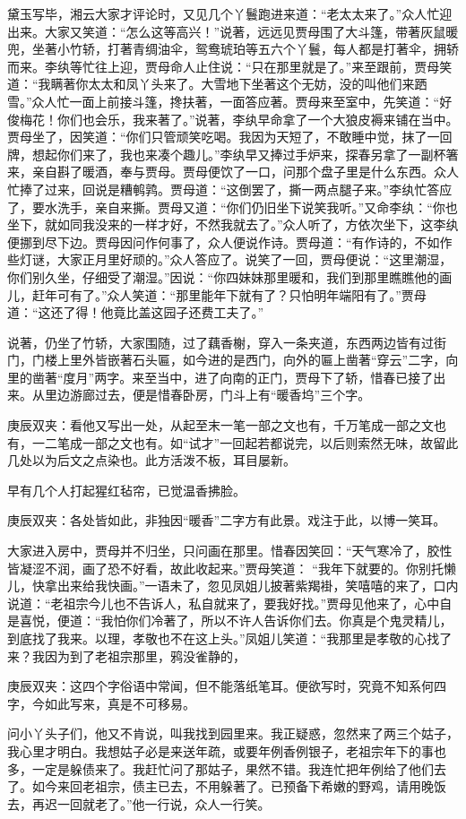 \begin{parag}
    黛玉写毕，湘云大家才评论时，又见几个丫鬟跑进来道：“老太太来了。”众人忙迎出来。大家又笑道：“怎么这等高兴！”说著，远远见贾母围了大斗篷，带著灰鼠暖兜，坐著小竹轿，打著青绸油伞，鸳鸯琥珀等五六个丫鬟，每人都是打著伞，拥轿而来。李纨等忙往上迎，贾母命人止住说：“只在那里就是了。”来至跟前，贾母笑道：“我瞒著你太太和凤丫头来了。大雪地下坐著这个无妨，没的叫他们来跴雪。”众人忙一面上前接斗篷，搀扶著，一面答应著。贾母来至室中，先笑道：“好俊梅花！你们也会乐，我来著了。”说著，李纨早命拿了一个大狼皮褥来铺在当中。贾母坐了，因笑道：“你们只管顽笑吃喝。我因为天短了，不敢睡中觉，抹了一回牌，想起你们来了，我也来凑个趣儿。”李纨早又捧过手炉来，探春另拿了一副杯箸来，亲自斟了暖酒，奉与贾母。贾母便饮了一口，问那个盘子里是什么东西。众人忙捧了过来，回说是糟鹌鹑。贾母道：“这倒罢了，撕一两点腿子来。”李纨忙答应了，要水洗手，亲自来撕。贾母又道：“你们仍旧坐下说笑我听。”又命李纨：“你也坐下，就如同我没来的一样才好，不然我就去了。”众人听了，方依次坐下，这李纨便挪到尽下边。贾母因问作何事了，众人便说作诗。贾母道：“有作诗的，不如作些灯谜，大家正月里好顽的。”众人答应了。说笑了一回，贾母便说：“这里潮湿，你们别久坐，仔细受了潮湿。”因说：“你四妹妹那里暖和，我们到那里瞧瞧他的画儿，赶年可有了。”众人笑道：“那里能年下就有了？只怕明年端阳有了。”贾母道：“这还了得！他竟比盖这园子还费工夫了。”
\end{parag}


\begin{parag}
    说著，仍坐了竹轿，大家围随，过了藕香榭，穿入一条夹道，东西两边皆有过街门，门楼上里外皆嵌著石头匾，如今进的是西门，向外的匾上凿著“穿云”二字，向里的凿著“度月”两字。来至当中，进了向南的正门，贾母下了轿，惜春已接了出来。从里边游廊过去，便是惜春卧房，门斗上有“暖香坞”三个字。\begin{note}庚辰双夹：看他又写出一处，从起至末一笔一部之文也有，千万笔成一部之文也有，一二笔成一部之文也有。如“试才”一回起若都说完，以后则索然无味，故留此几处以为后文之点染也。此方活泼不板，耳目屡新。\end{note}早有几个人打起猩红毡帘，已觉温香拂脸。\begin{note}庚辰双夹：各处皆如此，非独因“暖香”二字方有此景。戏注于此，以博一笑耳。\end{note}大家进入房中，贾母并不归坐，只问画在那里。惜春因笑回：“天气寒冷了，胶性皆凝涩不润，画了恐不好看，故此收起来。”贾母笑道： “我年下就要的。你别托懒儿，快拿出来给我快画。”一语未了，忽见凤姐儿披著紫羯褂，笑嘻嘻的来了，口内说道：“老祖宗今儿也不告诉人，私自就来了，要我好找。”贾母见他来了，心中自是喜悦，便道：“我怕你们冷著了，所以不许人告诉你们去。你真是个鬼灵精儿，到底找了我来。以理，孝敬也不在这上头。”凤姐儿笑道：“我那里是孝敬的心找了来？我因为到了老祖宗那里，鸦没雀静的，\begin{note}庚辰双夹：这四个字俗语中常闻，但不能落纸笔耳。便欲写时，究竟不知系何四字，今如此写来，真是不可移易。\end{note}问小丫头子们，他又不肯说，叫我找到园里来。我正疑惑，忽然来了两三个姑子，我心里才明白。我想姑子必是来送年疏，或要年例香例银子，老祖宗年下的事也多，一定是躲债来了。我赶忙问了那姑子，果然不错。我连忙把年例给了他们去了。如今来回老祖宗，债主已去，不用躲著了。已预备下希嫩的野鸡，请用晚饭去，再迟一回就老了。”他一行说，众人一行笑。
\end{parag}


